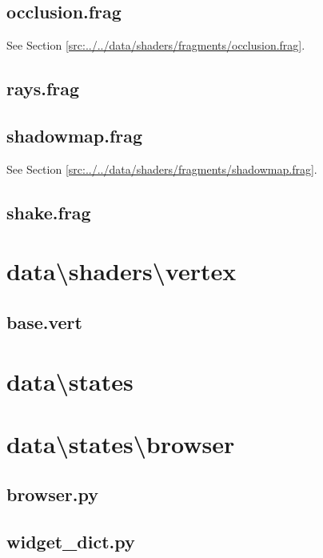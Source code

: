 \documentclass[../main/main.tex]{subfiles}
\begin{document}
\subsection{occlusion.frag}
See Section \ref{src:../../data/shaders/fragments/occlusion.frag}.

\subsection{rays.frag}

\label{src:data/shaders/fragments/rays.frag}

\subsection{shadowmap.frag}
See Section \ref{src:../../data/shaders/fragments/shadowmap.frag}.

\subsection{shake.frag}

\label{src:data/shaders/fragments/shake.frag}

\section{data\textbackslash shaders\textbackslash vertex}
\subsection{base.vert}

\label{src:data/shaders/vertex/base.vert}

\section{data\textbackslash states}
\section{data\textbackslash states\textbackslash browser}
\subsection{browser.py}

\label{src:data/states/browser/browser.py}

\subsection{widget\_dict.py}

\label{src:data/states/browser/widget_dict.py}
\end{document}
